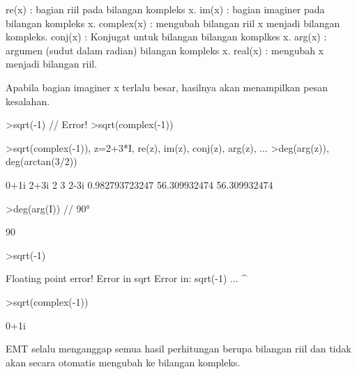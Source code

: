 \documentclass[a4paper,10pt]{article}
\begin{document}
\begin{eulernotebook}
\begin{eulercomment}
\end{eulercomment}
\begin{eulerttcomment}
  re(x) : bagian riil pada bilangan kompleks x.
  im(x) : bagian imaginer pada bilangan kompleks x.
  complex(x) : mengubah bilangan riil x menjadi bilangan kompleks.
  conj(x) : Konjugat untuk bilangan bilangan komplkes x.
  arg(x) : argumen (sudut dalam radian) bilangan kompleks x.
  real(x) : mengubah x menjadi bilangan riil.
\end{eulerttcomment}
\begin{eulercomment}

Apabila bagian imaginer x terlalu besar, hasilnya akan menampilkan
pesan kesalahan.

\end{eulercomment}
\begin{eulerttcomment}
  >sqrt(-1) // Error!
  >sqrt(complex(-1))
\end{eulerttcomment}
\begin{eulerprompt}
>sqrt(complex(-1)), z=2+3*I, re(z), im(z), conj(z), arg(z),  ...
>deg(arg(z)), deg(arctan(3/2))
\end{eulerprompt}
\begin{euleroutput}
  0+1i
  2+3i
  2
  3
  2-3i
  0.982793723247
  56.309932474
  56.309932474
\end{euleroutput}
\begin{eulerprompt}
>deg(arg(I)) // 90°
\end{eulerprompt}
\begin{euleroutput}
  90
\end{euleroutput}
\begin{eulerprompt}
>sqrt(-1)
\end{eulerprompt}
\begin{euleroutput}
  Floating point error!
  Error in sqrt
  Error in:
  sqrt(-1) ...
          ^
\end{euleroutput}
\begin{eulerprompt}
>sqrt(complex(-1))
\end{eulerprompt}
\begin{euleroutput}
  0+1i
\end{euleroutput}
\begin{eulercomment}
EMT selalu menganggap semua hasil perhitungan berupa bilangan riil dan
tidak akan secara otomatis mengubah ke bilangan kompleks.


\end{eulercomment}
\end{eulernotebook}
\end{document}
